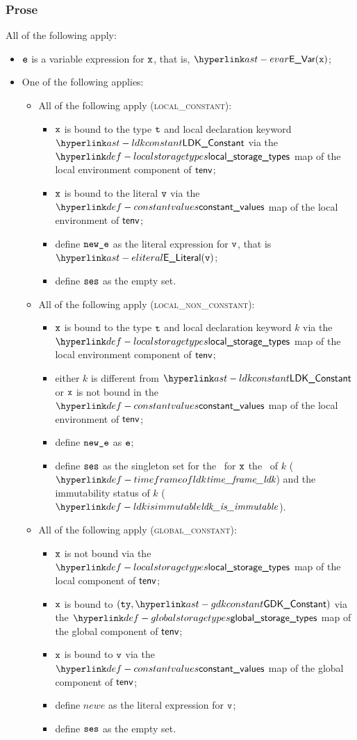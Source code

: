\subsubsection{Prose}
All of the following apply:
\begin{itemize}
  \item $\texttt{e}$ is a variable expression for $\texttt{x}$, that is, $\EVar(\vx)$;
  \item One of the following applies:
  \begin{itemize}
    \item All of the following apply (\textsc{local\_constant}):
    \begin{itemize}
    \item $\texttt{x}$ is bound to the type $\texttt{t}$ and local declaration keyword $\LDKConstant$
          via the $\localstoragetypes$ map of the local environment component of $\textsf{tenv}$;
    \item $\texttt{x}$ is bound to the literal $\texttt{v}$ via the $\constantvalues$ map of the local environment of $\textsf{tenv}$;
    \item define $\texttt{new\_e}$ as the literal expression for $\texttt{v}$, that is $\eliteral{\vv}$;
    \item define $\texttt{ses}$ as the empty set.
    \end{itemize}

    \item All of the following apply (\textsc{local\_non\_constant}):
    \begin{itemize}
    \item $\texttt{x}$ is bound to the type $\texttt{t}$ and local declaration keyword $k$
          via the \\
          $\localstoragetypes$ map of the local environment component of $\textsf{tenv}$;
    \item either $k$ is different from $\LDKConstant$ or
          $\texttt{x}$ is not bound in the \\
          $\constantvalues$ map of the local environment of $\textsf{tenv}$;
    \item define $\texttt{new\_e}$ as $\texttt{e}$;
    \item define $\texttt{ses}$ as the singleton set for the \ReadLocalTerm\ for $\texttt{x}$ the \timeframeterm\ of
          $k$ ($\timeframeofldk$) and the immutability status of $k$ ($\ldkisimmutable$).
    \end{itemize}

    \item All of the following apply (\textsc{global\_constant}):
    \begin{itemize}
    \item $\texttt{x}$ is not bound via the $\localstoragetypes$ map of the local component of $\textsf{tenv}$;
    \item $\texttt{x}$ is bound to $(\tty, \GDKConstant)$ via the $\globalstoragetypes$ map of the global component of $\textsf{tenv}$;
    \item $\texttt{x}$ is bound to $\texttt{v}$ via the $\constantvalues$ map of the global component of $\textsf{tenv}$;
    \item define $newe$ as the literal expression for $\texttt{v}$;
    \item define $\texttt{ses}$ as the empty set.
    \end{itemize}


\end{itemize}
\end{itemize}
